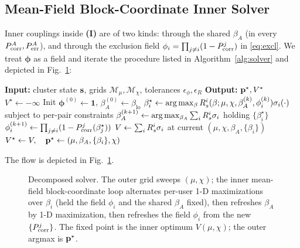 \subsection{Mean-Field Block-Coordinate Inner Solver}

Inner couplings inside \textbf{(I)} are of two kinds: through the shared $\beta_A$ (in every $P_{\mathrm{corr}}^A, P_{\mathrm{err}}^A$), and through the exclusion field $\phi_i = \prod_{j\neq i}(1-P_{\mathrm{corr}}^j)$ in \eqref{eq:excl}. We treat $\boldsymbol{\phi}$ as a field and iterate the procedure listed in Algorithm~\ref{alg:solver} and depicted in Fig.~\ref{fig:decomp}:

\begin{algorithm}[!htbp]
\caption{Decomposed solver for \textbf{(P)}}\label{alg:solver}
\begin{algorithmic}[1]
\STATE \textbf{Input:} cluster state $\mathbf{s}$, grids $\mathcal{M}_\mu, \mathcal{M}_\chi$, tolerances $\epsilon_\phi, \epsilon_R$
\STATE \textbf{Output:} $\mathbf{p}^\star, V^\star$
\STATE $V^\star \gets -\infty$
  \STATE Init $\boldsymbol{\phi}^{(0)}\gets \boldsymbol{1}$, $\beta_A^{(0)}\gets\beta_{\mathrm{lo}}$
      \STATE $\beta_i^\star \gets \arg\max_{\beta} R_s^i(\beta;\mu,\chi,\beta_A^{(k)},\phi_i^{(k)})\sigma_i(\cdot)$ subject to per-pair constraints 
    \ENDFOR
    \STATE $\beta_A^{(k+1)} \gets \arg\max_{\beta_A} \sum_i R_s^i\sigma_i$ holding $\{\beta_i^\star\}$ 
    \STATE $\phi_i^{(k+1)} \gets \prod_{j\neq i}(1 - P_{\mathrm{corr}}^j(\beta_j^\star))$ 
  \ENDFOR
  \STATE $V \gets \sum_i R_s^i \sigma_i$ at current $(\mu,\chi,\beta_A,\{\beta_i\})$
    \STATE $V^\star \gets V,\quad \mathbf{p}^\star \gets (\mu,\beta_A,\{\beta_i\},\chi)$
  \ENDIF
\ENDFOR
\end{algorithmic}
\end{algorithm}

The flow is depicted in Fig.~\ref{fig:decomp}.

\begin{figure}[!htbp]
\centering
\resizebox{\columnwidth}{!}{}
\caption{Decomposed solver. The outer grid sweeps $(\mu,\chi)$; the inner mean-field block-coordinate loop alternates per-user 1-D maximizations over $\beta_i$ (held the field $\phi_i$ and the shared $\beta_A$ fixed), then refreshes $\beta_A$ by 1-D maximization, then refreshes the field $\phi_i$ from the new $\{P_{\mathrm{corr}}^j\}$. The fixed point is the inner optimum $V(\mu,\chi)$; the outer argmax is $\mathbf{p}^\star$.}
\label{fig:decomp}
\end{figure}


